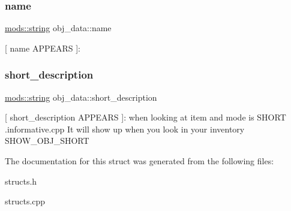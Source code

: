 \subsubsection{\texorpdfstring{name}{name}}
{\footnotesize\ttfamily \hyperlink{structmods_1_1string}{mods\+::string} obj\+\_\+data\+::name}

\mbox{[} \textquotesingle{}name\textquotesingle{} A\+P\+P\+E\+A\+RS \mbox{]}\+: \mbox{\label{structobj__data_a38420e39fa29369569eab896fd57ded7}} 
\subsubsection{\texorpdfstring{short\+\_\+description}{short\_description}}
{\footnotesize\ttfamily \hyperlink{structmods_1_1string}{mods\+::string} obj\+\_\+data\+::short\+\_\+description}

\mbox{[} \textquotesingle{}short\+\_\+description\textquotesingle{} A\+P\+P\+E\+A\+RS \mbox{]}\+: when looking at item and mode is S\+H\+O\+RT .informative.\+cpp It will show up when you look in your inventory S\+H\+O\+W\+\_\+\+O\+B\+J\+\_\+\+S\+H\+O\+RT 

The documentation for this struct was generated from the following files\+:\begin{DoxyCompactItemize}
\item 
structs.\+h\item 
structs.\+cpp\end{DoxyCompactItemize}
